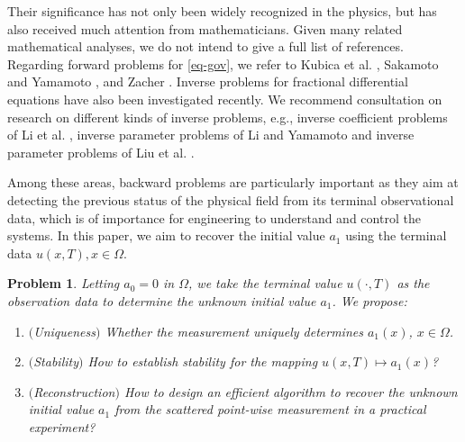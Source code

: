 \documentclass[11pt]{article}
\newtheorem{problem}{Problem}
\numberwithin{equation}{section}
\begin{document}
Their significance has not only been widely recognized in the physics, but has also received much attention from mathematicians. Given many related mathematical analyses, we do not intend to give a full list of references. Regarding forward problems for \eqref{eq-gov}, we refer to Kubica et al. \cite{Kubica2020intro}, Sakamoto and Yamamoto \cite{sakamoto2011initial}, and Zacher \cite{Zacher2009weak}. Inverse problems for fractional differential equations have also been investigated recently. We recommend consultation on research on different kinds of inverse problems, e.g., inverse coefficient problems of Li et al. \cite{liliuyamamoto2019inverse}, inverse parameter problems of Li and Yamamoto \cite{liyamamoto2019inverse} and inverse parameter problems of Liu et al. \cite{liu2019inverseproblems}.

Among these areas, backward problems are particularly important as they aim at detecting the previous status of the physical field from its terminal observational data, which is of importance for engineering to understand and control the systems. In this paper, we aim to recover the initial value $a_1$ using the terminal data $u(x,T), x \in \Omega$.
\begin{problem}%
Letting $a_0=0$ in $\Omega$, we take the terminal value $u(\cdot,T)$ as the observation data to determine the unknown initial value $a_1$. We propose:
\begin{enumerate}
\item $($Uniqueness$)$ Whether the measurement uniquely determines $a_1(x)$, $x\in\Omega$.
\item $($Stability$)$ How to establish stability for the mapping $u(x,T) \mapsto a_1(x)$?
\item $($Reconstruction$)$ How to design an efficient algorithm to recover the unknown initial value $a_1$ from the scattered point-wise measurement in a practical experiment?
\end{enumerate}
\end{problem}
\end{document}
